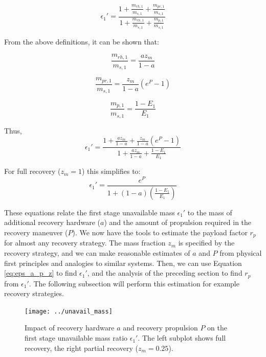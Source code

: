 \documentclass[conf]{new-aiaa}
\begin{document}
\begin{equation}
\epsilon_1' = \frac{1 + \frac{m_{rh,1}}{m_{s,1}} + \frac{m_{pr,1}}{m_{s,1}} }{1 + \frac{m_{rh,1}}{m_{s,1}} + \frac{m_{p,1}}{m_{s,1}} }
\end{equation}

From the above definitions, it can be shown that:

\begin{equation}
\frac{m_{rh,1}}{m_{s,1}} = \frac{a z_m}{1 - a}
\end{equation}

\begin{equation}
\frac{m_{pr,1}}{m_{s,1}} = \frac{z_m}{1 - a} (e^P - 1)
\end{equation}

\begin{equation}
\frac{m_{p,1}}{m_{s,1}} = \frac{1 - E_1}{E_1}
\end{equation}

Thus,
\begin{equation}
\label{eq:eps_a_p_z}
\epsilon_1' = \frac{1 + \frac{a z_m}{1 - a} +  \frac{z_m}{1 - a} (e^P - 1) }{1 + \frac{a z_m}{1 - a} + \frac{1 - E_1}{E_1} }
\end{equation}

For full recovery ($z_m = 1$) this simplifies to:
\begin{equation}
\epsilon_1' = \frac{e^P}{1 + (1 - a) \left( \frac{1 - E_1}{E_1} \right)}
\end{equation}

These equations relate the first stage unavailable mass $\epsilon_1'$ to the mass of additional recovery hardware ($a$) and the amount of propulsion required in the recovery maneuver ($P$). We now have the tools to estimate the payload factor $r_p$ for almost any recovery strategy. The mass fraction $z_m$ is specified by the recovery strategy, and we can make reasonable estimates of $a$ and $P$ from physical first principles and analogies to similar systems. Then, we can use Equation \ref{eq:eps_a_p_z} to find $\epsilon_1'$, and the analysis of the preceding section to find $r_p$ from $\epsilon_1'$. The following subsection will perform this estimation for example recovery strategies.

\begin{figure}[hbt!]
	\centering
	\texttt{[image: ../unavail\_mass]}
	\caption{\label{fig:unavail_mass} Impact of recovery hardware $a$ and recovery propulsion $P$ on the first stage unavailable mass ratio $\epsilon_1'$. The left subplot shows full recovery, the right partial recovery ($z_m=0.25$).}
\end{figure}
\end{document}
